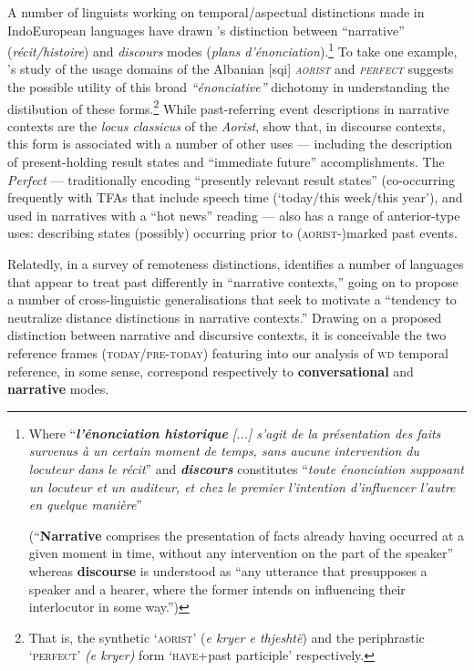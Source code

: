A number of linguists working on temporal/aspectual distinctions made in Indo\-European languages have drawn \citeauthor{Benveniste1966}'s distinction between ``narrative'' (\textit{récit\slash{}histoire}) and \textit{discours} modes (\textit{plans d'énonciation}).\footnote{Where ``\textit{\textbf{l'énonciation historique} [...] s'agit de la présentation des faits survenus à un certain moment de temps, sans aucune intervention du locuteur dans le récit}'' and \textit{\textbf{discours}} constitutes ``\textit{toute énonciation supposant un locuteur et un auditeur, et chez le premier l'intention d'influencer l'autre en quelque manière}''
	
	(``\textbf{Narrative} comprises the presentation of facts already having occurred at a given moment in time, without any intervention on the part of the speaker'' whereas \textbf{discourse} is understood as ``any utterance that presupposes a speaker and a hearer, where the former intends on influencing their interlocutor in some way.'')} To take one example, \citeauthor{Duchet2016}'s \citeyearpar{Duchet2016} study of the usage domains of the Albanian [\gls{sqi}] \textit{\textsc{aorist}} and \textit{\textsc{perfect}} suggests the possible utility of this broad \textit{``énonciative''} dichotomy in understanding the distibution of these forms.\footnote{That is, the synthetic `\textsc{aorist}' (\textit{e kryer e thjeshtë}) and the periphrastic `\textsc{perfect}' \textit{(e kryer)} form `\textsc{have}+past participle' respectively.} While past-referring event descriptions in narrative contexts are the \textit{locus classicus} of the \textit{Aorist}, \citeauthor{Duchet2016} show that, in discourse contexts, this form is associated with a number of other uses --- including the description of present-holding result states and ``immediate future'' accomplishments. The  \textit{Perfect} --- traditionally encoding ``presently relevant result states'' (co-occurring frequently with TFAs that include speech time (`today/this week/this year'), and used in narratives with a ``hot news'' reading --- also has a range of anterior-type uses: describing states (possibly) occurring prior to (\textsc{aorist-})marked past events.
 
Relatedly, in a survey of remoteness distinctions, \citet[116\textit{ff}]{Dahl1983} identifies a number of languages that appear to treat past differently in ``narrative contexts,'' going on to propose a number of cross-linguistic generalisations that seek to motivate a ``tendency to neutralize distance distinctions in narrative contexts.'' Drawing on a proposed distinction between narrative and discursive contexts, it is conceivable the two reference frames (\textsc{today\slash{}pre-today}) featuring into our analysis of \textsc{wd} temporal reference, in some sense, correspond respectively to \textbf{conversational} and \textbf{narrative} modes. 
 
